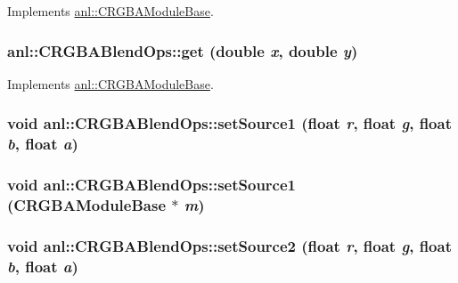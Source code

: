 Implements \hyperlink{classanl_1_1CRGBAModuleBase_a097897c2d625c824832325260169c90e}{anl::CRGBAModuleBase}.\hypertarget{classanl_1_1CRGBABlendOps_aacba235e62c02f99459fed2e79992fe3}{
\subsubsection[{get}]{ anl::CRGBABlendOps::get (double {\em x}, \/  double {\em y})}}
\label{classanl_1_1CRGBABlendOps_aacba235e62c02f99459fed2e79992fe3}


Implements \hyperlink{classanl_1_1CRGBAModuleBase_afb6896d38ae92b9bb784fe5dc731ae67}{anl::CRGBAModuleBase}.\hypertarget{classanl_1_1CRGBABlendOps_a9fab3f2a1f371297e83d4dd5ff91c514}{
\subsubsection[{setSource1}]{\setlength{\rightskip}{0pt plus 5cm}void anl::CRGBABlendOps::setSource1 (float {\em r}, \/  float {\em g}, \/  float {\em b}, \/  float {\em a})}}
\label{classanl_1_1CRGBABlendOps_a9fab3f2a1f371297e83d4dd5ff91c514}
\hypertarget{classanl_1_1CRGBABlendOps_a2a5341db3a1d18430d50fc41673d07a9}{
\subsubsection[{setSource1}]{\setlength{\rightskip}{0pt plus 5cm}void anl::CRGBABlendOps::setSource1 ({\bf CRGBAModuleBase} $\ast$ {\em m})}}
\label{classanl_1_1CRGBABlendOps_a2a5341db3a1d18430d50fc41673d07a9}
\hypertarget{classanl_1_1CRGBABlendOps_aad67d910ce4b78aab12fbc5eab6bce9a}{
\subsubsection[{setSource2}]{\setlength{\rightskip}{0pt plus 5cm}void anl::CRGBABlendOps::setSource2 (float {\em r}, \/  float {\em g}, \/  float {\em b}, \/  float {\em a})}}
